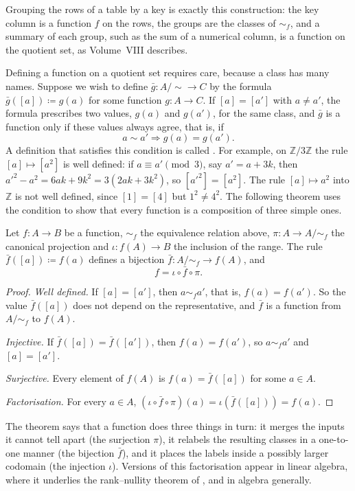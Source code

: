 Grouping the rows of a table by a key is exactly this construction: the key column is a function $f$ on the rows, the groups are the classes of $\sim_f$, and a summary of each group, such as the sum of a numerical column, is a function on the quotient set, as Volume~VIII describes.

Defining a function on a quotient set requires care, because a class has many names. Suppose we wish to define $\bar g\colon A/{\sim}\to C$ by the formula $\bar g([a])\coloneqq g(a)$ for some function $g\colon A\to C$. If $[a]=[a']$ with $a\ne a'$, the formula prescribes two values, $g(a)$ and $g(a')$, for the same class, and $\bar g$ is a function only if these values always agree, that is, if
\[
a\sim a'\Rightarrow g(a)=g(a').
\]
A definition that satisfies this condition is called . For example, on $\mathbb Z/3\mathbb Z$ the rule $[a]\mapsto[a^2]$ is well defined: if $a\equiv a'\pmod3$, say $a'=a+3k$, then $a'^2-a^2=6ak+9k^2=3(2ak+3k^2)$, so $[a'^2]=[a^2]$. The rule $[a]\mapsto a^2$ into $\mathbb Z$ is not well defined, since $[1]=[4]$ but $1^2\ne4^2$. The following theorem uses the condition to show that every function is a composition of three simple ones.

\begin{theorem}
\label{thm:factorisation}
Let $f\colon A\to B$ be a function, $\sim_f$ the equivalence relation above, $\pi\colon A\to A/{\sim_f}$ the canonical projection and $\iota\colon f(A)\to B$ the inclusion of the range. The rule $\bar f([a])\coloneqq f(a)$ defines a bijection $\bar f\colon A/{\sim_f}\to f(A)$, and
\[
f=\iota\circ\bar f\circ\pi .
\]
\end{theorem}

\begin{proof}
\emph{Well defined.} If $[a]=[a']$, then $a\sim_fa'$, that is, $f(a)=f(a')$. So the value $\bar f([a])$ does not depend on the representative, and $\bar f$ is a function from $A/{\sim_f}$ to $f(A)$.

\emph{Injective.} If $\bar f([a])=\bar f([a'])$, then $f(a)=f(a')$, so $a\sim_fa'$ and $[a]=[a']$.

\emph{Surjective.} Every element of $f(A)$ is $f(a)=\bar f([a])$ for some $a\in A$.

\emph{Factorisation.} For every $a\in A$, $(\iota\circ\bar f\circ\pi)(a)=\iota(\bar f([a]))=f(a)$.
\end{proof}

The theorem says that a function does three things in turn: it merges the inputs it cannot tell apart (the surjection $\pi$), it relabels the resulting classes in a one-to-one manner (the bijection $\bar f$), and it places the labels inside a possibly larger codomain (the injection $\iota$). Versions of this factorisation appear in linear algebra, where it underlies the rank--nullity theorem of , and in algebra generally.

